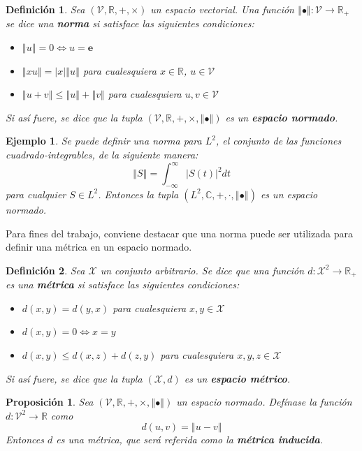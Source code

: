 \documentclass[12pt,letterpaper,draft]{book}
\newtheorem{definicion}{Definición}[chapter]
\newtheorem{proposicion}[teorema]{Proposición}
\newtheorem{ejemplo}{Ejemplo}[chapter]
\newcommand{\R}{\mathbb{R}}
\newcommand{\C}{\mathbb{C}}
\newcommand{\intR}{\int_{-\infty}^{\infty}}
\newcommand{\abso}[1]{\left| #1 \right|}
\newcommand{\norma}[1]{\left\Vert #1 \right\Vert}
\begin{document}
\begin{definicion}
Sea $(\mathcal{V},\R,+,\times)$ un espacio vectorial. Una función $\norma{\bullet}: \mathcal{V}\rightarrow\R_+$ se dice una \textbf{norma} si satisface las siguientes condiciones:
\begin{itemize}
\item $\norma{u} = 0 \Leftrightarrow u = \boldsymbol{e}$
\item $\norma{x u} = \abso{x} \norma{u}$ para cualesquiera $x \in \R$, $u \in \mathcal{V}$
\item $\norma{u+v} \leq \norma{u} + \norma{v}$ para cualesquiera $u, v \in \mathcal{V}$
\end{itemize}
Si así fuere, se dice que la tupla $(\mathcal{V},\R,+,\times, \norma{\bullet})$ es un \textbf{espacio normado}.
\end{definicion}

\begin{ejemplo}
Se puede definir una norma para $L^{2}$, el conjunto de las funciones cuadrado-integrables, de la siguiente manera:
\begin{equation}
\norma{S} = \intR \abso{S(t)}^{2} dt
\end{equation} 
para cualquier $S \in L^{2}$. Entonces la tupla $(L^{2},\C,+,\cdot,\norma{\bullet})$ es un espacio normado.
\label{ejemplo:norma_L2}
\end{ejemplo}

Para fines del trabajo, conviene destacar que una norma puede ser utilizada para definir una métrica en un espacio normado.

\begin{definicion}
Sea $\mathcal{X}$ un conjunto arbitrario. Se dice que una función $d: \mathcal{X}^{2}\rightarrow \R_+$ es una \textbf{métrica} si satisface las siguientes condiciones:
\begin{itemize}
\item $d(x,y) = d(y,x)$ para cualesquiera $x,y \in \mathcal{X}$
\item $d(x,y)=0 \Leftrightarrow x=y$
\item $d(x,y) \leq d(x,z) + d(z,y)$ para cualesquiera $x,y,z \in \mathcal{X}$
\end{itemize}
Si así fuere, se dice que la tupla $(\mathcal{X},d)$ es un \textbf{espacio métrico}.
\end{definicion}

\begin{proposicion}
Sea $(\mathcal{V},\R,+,\times, \norma{\bullet})$ un espacio normado. Defínase la función $d: \mathcal{V}^{2} \rightarrow \R$ como
\begin{equation}
d(u,v) = \norma{u-v}
\end{equation}
Entonces $d$ es una métrica, que será referida como la \textbf{métrica inducida}.
\end{proposicion}
\end{document}
